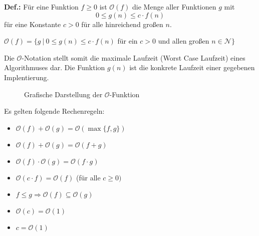 \begin{shaded}
	\noindent
	\textbf{Def.:} Für eine Funktion \(f \geq 0\) ist \(\mathcal{O}(f)\) die Menge aller Funktionen \(g\) mit 
		\[0 \leq g(n) \leq c \cdot f(n)\] 
		für eine Konstante \(c > 0\) für alle hinreichend großen \(n\).
		
		\(\mathcal{O}(f) = \{ g\:|\: 0 \leq g(n) \leq c \cdot f(n)\) für ein \(c > 0\) und allen großen \(n \in \mathcal{N}\}\)
\end{shaded}
Die \(\mathcal{O}\)-Notation stellt somit die maximale Laufzeit (Worst Case Laufzeit) eines Algorithmuses dar.
Die Funktion \(g(n)\) ist die konkrete Laufzeit einer gegebenen Implentierung.
\begin{figure}[htbp]
	\begin{center}
	\end{center}
	\label{img:ONotation}
	\caption{Grafische Darstellung der \(\mathcal{O}\)-Funktion}
\end{figure}

Es gelten folgende Rechenregeln:
\begin{itemize}
	\item \(\mathcal{O}(f) + \mathcal{O}(g) = \mathcal{O}(\max\{f,g\})\)
	\item \(\mathcal{O}(f) + \mathcal{O}(g) = \mathcal{O}(f + g)\)
	\item \(\mathcal{O}(f) \cdot \mathcal{O}(g) = \mathcal{O}(f \cdot g)\)
	\item \(\mathcal{O}(c \cdot f) = \mathcal{O}(f)\) (für alle \(c \geq 0)\)
	\item \(f \leq g \Rightarrow \mathcal{O}(f) \subseteq \mathcal{O}(g)\)
	\item \(\mathcal{O}(c) = \mathcal{O}(1)\)
	\item \(c = \mathcal{O}(1)\)
\end{itemize}


